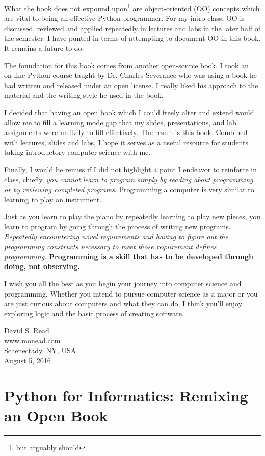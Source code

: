 What the book does not expound upon\footnote{but arguably should} are object-oriented (OO) concepts which are vital to being an effective Python programmer. For my intro class, OO is discussed, reviewed and applied repeatedly in lectures and labs in the later half of the semester. I have punted in terms of attempting to document OO in this book. It remains a future to-do.

The foundation for this book comes from another open-source book. I took an on-line Python course taught by Dr. Charles Severance who was using a book he had written and released under an open license. I really liked his approach to the material and the writing style he used in the book.

I decided that having an open book which I could freely alter and extend would allow me to fill a learning mode gap that my slides, presentations, and lab assignments were unlikely to fill effectively. The result is this book. Combined with lectures, slides and labs, I hope it serves as a useful resource for students taking introductory computer science with me.

Finally, I would be remiss if I did not highlight a point I endeavor to reinforce in class, chiefly, \textit{you cannot learn to program simply by reading about programming or by reviewing completed programs}. Programming a computer is very similar to learning to play an instrument. 

Just as you learn to play the piano by repeatedly learning to play new pieces, you learn to program by going through the process of writing new programs. \textit{Repeatedly encountering novel requirements and having to figure out the programming constructs necessary to meet those requirement defines programming.} \textbf{Programming is a skill that has to be developed through doing, not observing.}

I wish you all the best as you begin your journey into computer science and programming. Whether you intend to pursue computer science as a major or you are just curious about computers and what they can do, I think you'll enjoy exploring logic and the basic process of creating software.

David S. Read\\
www.monead.com\\
Schenectady, NY, USA\\
August 5, 2016

\clearpage

\section*{Python for Informatics: Remixing an Open Book}


